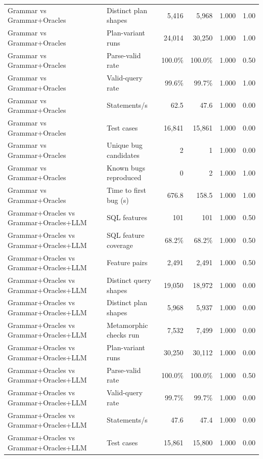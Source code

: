 \begin{table}[t]
\begin{tabular}{llrrrr}
    Grammar vs Grammar+Oracles & Distinct plan shapes & 5{,}416 & 5{,}968 & 1.000 & 1.00 \\
    Grammar vs Grammar+Oracles & Plan-variant runs & 24{,}014 & 30{,}250 & 1.000 & 1.00 \\
    Grammar vs Grammar+Oracles & Parse-valid rate & 100.0\% & 100.0\% & 1.000 & 0.50 \\
    Grammar vs Grammar+Oracles & Valid-query rate & 99.6\% & 99.7\% & 1.000 & 1.00 \\
    Grammar vs Grammar+Oracles & Statements/s & 62.5 & 47.6 & 1.000 & 0.00 \\
    Grammar vs Grammar+Oracles & Test cases & 16{,}841 & 15{,}861 & 1.000 & 0.00 \\
    Grammar vs Grammar+Oracles & Unique bug candidates & 2 & 1 & 1.000 & 0.00 \\
    Grammar vs Grammar+Oracles & Known bugs reproduced & 0 & 2 & 1.000 & 1.00 \\
    Grammar vs Grammar+Oracles & Time to first bug (s) & 676.8 & 158.5 & 1.000 & 1.00 \\
    Grammar+Oracles vs Grammar+Oracles+LLM & SQL features & 101 & 101 & 1.000 & 0.50 \\
    Grammar+Oracles vs Grammar+Oracles+LLM & SQL feature coverage & 68.2\% & 68.2\% & 1.000 & 0.50 \\
    Grammar+Oracles vs Grammar+Oracles+LLM & Feature pairs & 2{,}491 & 2{,}491 & 1.000 & 0.50 \\
    Grammar+Oracles vs Grammar+Oracles+LLM & Distinct query shapes & 19{,}050 & 18{,}972 & 1.000 & 0.00 \\
    Grammar+Oracles vs Grammar+Oracles+LLM & Distinct plan shapes & 5{,}968 & 5{,}937 & 1.000 & 0.00 \\
    Grammar+Oracles vs Grammar+Oracles+LLM & Metamorphic checks run & 7{,}532 & 7{,}499 & 1.000 & 0.00 \\
    Grammar+Oracles vs Grammar+Oracles+LLM & Plan-variant runs & 30{,}250 & 30{,}112 & 1.000 & 0.00 \\
    Grammar+Oracles vs Grammar+Oracles+LLM & Parse-valid rate & 100.0\% & 100.0\% & 1.000 & 0.50 \\
    Grammar+Oracles vs Grammar+Oracles+LLM & Valid-query rate & 99.7\% & 99.7\% & 1.000 & 0.00 \\
    Grammar+Oracles vs Grammar+Oracles+LLM & Statements/s & 47.6 & 47.4 & 1.000 & 0.00 \\
    Grammar+Oracles vs Grammar+Oracles+LLM & Test cases & 15{,}861 & 15{,}800 & 1.000 & 0.00 \\

\end{tabular}
\end{table}
